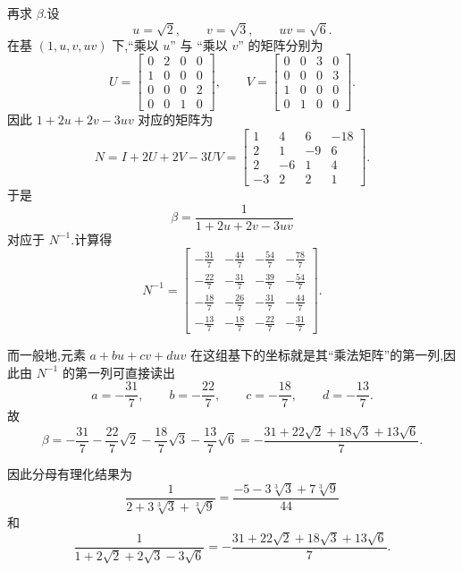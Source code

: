 \begin{problem}
\begin{solution}
        再求 $\beta$.设
        \[
            u=\sqrt2,\qquad v=\sqrt3,\qquad uv=\sqrt6.
        \]
        在基 $\left(1,u,v,uv\right)$ 下,“乘以 $u$” 与 “乘以 $v$” 的矩阵分别为
        \[
            U=
            \begin{bmatrix}
                0 & 2 & 0 & 0\\
                1 & 0 & 0 & 0\\
                0 & 0 & 0 & 2\\
                0 & 0 & 1 & 0
            \end{bmatrix},
            \qquad
            V=
            \begin{bmatrix}
                0 & 0 & 3 & 0\\
                0 & 0 & 0 & 3\\
                1 & 0 & 0 & 0\\
                0 & 1 & 0 & 0
            \end{bmatrix}.
        \]
        因此 $1+2u+2v-3uv$ 对应的矩阵为
        \[
            N=I+2U+2V-3UV=
            \begin{bmatrix}
                1 & 4 & 6 & -18\\
                2 & 1 & -9 & 6\\
                2 & -6 & 1 & 4\\
                -3 & 2 & 2 & 1
            \end{bmatrix}.
        \]
        于是
        \[
            \beta=\frac1{1+2u+2v-3uv}
        \]
        对应于 $N^{-1}$.计算得
        \[
            N^{-1}=
            \begin{bmatrix}
                -\frac{31}{7} & -\frac{44}{7} & -\frac{54}{7} & -\frac{78}{7}\\[2mm]
                -\frac{22}{7} & -\frac{31}{7} & -\frac{39}{7} & -\frac{54}{7}\\[2mm]
                -\frac{18}{7} & -\frac{26}{7} & -\frac{31}{7} & -\frac{44}{7}\\[2mm]
                -\frac{13}{7} & -\frac{18}{7} & -\frac{22}{7} & -\frac{31}{7}
            \end{bmatrix}.
        \]

        而一般地,元素 $a+bu+cv+duv$ 在这组基下的坐标就是其“乘法矩阵”的第一列,因此由 $N^{-1}$ 的第一列可直接读出
        \[
            a=-\frac{31}{7},\qquad
            b=-\frac{22}{7},\qquad
            c=-\frac{18}{7},\qquad
            d=-\frac{13}{7}.
        \]
        故
        \[
            \boxed{
                \beta
                =-\frac{31}{7}-\frac{22}{7}\sqrt2-\frac{18}{7}\sqrt3-\frac{13}{7}\sqrt6
                =-\frac{31+22\sqrt2+18\sqrt3+13\sqrt6}{7}
            }.
        \]

        因此分母有理化结果为
        \[
            \boxed{
                \frac{1}{2+3\sqrt[3]{3}+\sqrt[3]{9}}
                =\frac{-5-3\sqrt[3]{3}+7\sqrt[3]{9}}{44}
            }
        \]
        和
        \[
            \boxed{
                \frac{1}{1+2\sqrt2+2\sqrt3-3\sqrt6}
                =-\frac{31+22\sqrt2+18\sqrt3+13\sqrt6}{7}
            }.
        \]
    \end{solution}
\end{problem}

